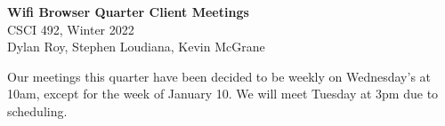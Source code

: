 \documentclass[11pt]{article}
\begin{document}
\begin{center}
  \textbf{\Large Wifi Browser Quarter Client Meetings}\\\large CSCI 492, Winter 2022\\
  Dylan Roy, Stephen Loudiana, Kevin McGrane
\end{center}

Our meetings this quarter have been decided to be weekly on Wednesday's at 10am, except for the week
of January 10. We will meet Tuesday at 3pm due to scheduling.
\end{document}
